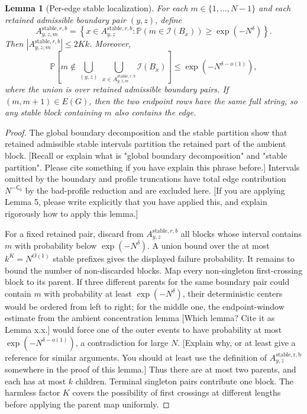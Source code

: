 \documentclass[11pt]{article}
\newtheorem{lem}{Lemma}
\newcommand{\cI}{\mathcal I}
\newcommand{\Pbb}{\mathbb P}
\newcommand{\stable}{\mathrm{stable}}
\newcommand{\jscomment}[1]{\textup{\textsf{\color{blue}[#1]}}}
\begin{document}
\begin{lem}[Per-edge stable localization]
For each \(m\in\{1,\ldots,N-1\}\) and each retained admissible boundary
pair \((y,z)\), define
\[
    A_{y,z,m}^{\stable,r,b}
    =
    \left\{
    x\in A_{y,z}^{\stable,r,b}:
    \Pbb(m\in\cI(B_x))\ge \exp(-N^\delta)
    \right\}.
\]
Then \(|A_{y,z,m}^{\stable,r,b}|\le 2Kk\). Moreover,
\[
    \Pbb\left[
    m\notin
    \bigcup_{(y,z)}\ \bigcup_{x\in A_{y,z,m}^{\stable,r,b}}
    \cI(B_x)
    \right]
    \le \exp(-N^{\delta-o(1)}),
\]
where the union is over retained admissible boundary pairs. If
\((m,m+1)\in E(G)\), then the two endpoint rows have the same full string,
so any stable block containing \(m\) also contains the edge.
\end{lem}

\begin{proof}
The global boundary decomposition and the stable partition show that
retained admissible stable intervals partition the retained part of the
ambient block. 
\jscomment{Recall or explain what is "global boundary decomposition" and "stable partition". Please cite something if you have explain this phrase before.}
Intervals omitted by the boundary and profile truncations
have total edge contribution \(N^{-\mathsf C_0}\) by the bad-profile
reduction and are excluded here.
\jscomment{If you are applying Lemma 5, please write explicitly that you have applied this, and explain rigorously how to apply this lemma.}

For a fixed retained pair, discard from \(A_{y,z}^{\stable,r,b}\) all
blocks whose interval contains \(m\) with probability below
\(\exp(-N^\delta)\). A union bound over the at most \(k^K=N^{O(1)}\)
stable prefixes gives the displayed failure probability. It remains to
bound the number of non-discarded blocks. Map every non-singleton
first-crossing block to its parent. If three different parents for the
same boundary pair could contain \(m\) with probability at least
\(\exp(-N^\delta)\), their deterministic centers would be ordered from
left to right; for the middle one, the endpoint-window estimate from the
ambient concentration lemma \jscomment{Which lemma? Cite it as Lemma x.x.} would force one of the outer events to have
probability at most \(\exp(-N^{\delta-o(1)})\), a contradiction for large
\(N\). 
\jscomment{Explain why, or at least give a reference for similar arguments. You should at least use the definition of $A^{\mathrm{stable,r,b}}_{y,z}$ somewhere in the proof of this lemma.}
Thus there are at most two parents, and each has at most \(k\)
children. Terminal singleton pairs contribute one block. The harmless
factor \(K\) covers the possibility of first crossings at different
lengths before applying the parent map uniformly.
\end{proof}
\end{document}
